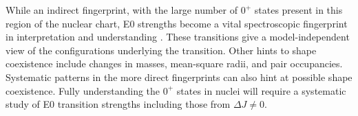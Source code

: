 While an indirect fingerprint, with the large number of $0^+$ states present in this region of the nuclear chart, E0 strengths become a vital spectroscopic fingerprint in interpretation and understanding \citep{heyde11:_shape_coexist}. These transitions give a model-independent view of the configurations underlying the transition. Other hints to shape coexistence include changes in masses, mean-square radii, and pair occupancies. Systematic patterns in the more direct fingerprints can also hint at possible shape coexistence. Fully understanding the $0^+$ states in nuclei will require a systematic study of E0 transition strengths including those from $\Delta J\neq0$.
